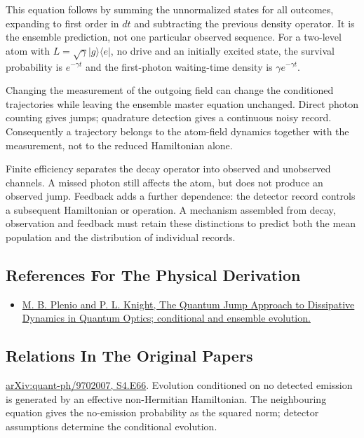\documentclass[11pt,oneside]{book}
\begin{document}
This equation follows by summing the unnormalized states for all outcomes, expanding to first order in \(dt\) and subtracting the previous density operator. It is the ensemble prediction, not one particular observed sequence. For a two-level atom with \(L=\sqrt{\gamma}|g\rangle\langle e|\), no drive and an initially excited state, the survival probability is \(e^{-\gamma t}\) and the first-photon waiting-time density is \(\gamma e^{-\gamma t}\).

Changing the measurement of the outgoing field can change the conditioned trajectories while leaving the ensemble master equation unchanged. Direct photon counting gives jumps; quadrature detection gives a continuous noisy record. Consequently a trajectory belongs to the atom-field dynamics together with the measurement, not to the reduced Hamiltonian alone.

Finite efficiency separates the decay operator into observed and unobserved channels. A missed photon still affects the atom, but does not produce an observed jump. Feedback adds a further dependence: the detector record controls a subsequent Hamiltonian or operation. A mechanism assembled from decay, observation and feedback must retain these distinctions to predict both the mean population and the distribution of individual records.

\subsection*{References For The Physical Derivation}
\begin{itemize}
\item \href{https://arxiv.org/abs/quant-ph/9702007}{M. B. Plenio and P. L. Knight, The Quantum Jump Approach to Dissipative Dynamics in Quantum Optics; conditional and ensemble evolution.}
\end{itemize}

\subsection*{Relations In The Original Papers}

\href{https://arxiv.org/html/quant-ph/9702007#S4.E66}{arXiv:quant-ph/9702007, S4.E66}. Evolution conditioned on no detected emission is generated by an effective non-Hermitian Hamiltonian. The neighbouring equation gives the no-emission probability as the squared norm; detector assumptions determine the conditional evolution.
\end{document}
